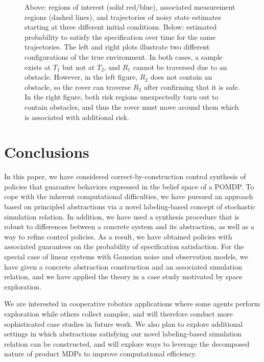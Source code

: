 \documentclass{ifacconf}
\begin{document}
\begin{figure}
  \footnotesize
  \setlength{}
  \setlength{}

  \begin{center}
       
  \end{center}

  \setlength{}
  \setlength{}

  \begin{center}
       
  \end{center}
  \caption{Above: regions of interest (solid red/blue), associated measurement regions (dashed lines), and trajectories of noisy state estimates starting at three different initial conditions. Below: estimated probability to satisfy the specification over time for the same trajectories. The left and right plots illustrate two different configurations of the true environment. In both cases, a sample exists at $T_1$ but not at $T_2$, and $R_1$ cannot be traversed due to an obstacle. However, in the left figure, $R_2$ does not contain an obstacle, so the rover can traverse $R_2$ after confirming that it is safe. In the right figure, both risk regions unexpectedly turn out to contain obstacles, and thus the rover must move around them which is associated with additional risk.}
  \label{fig:exp1}
\end{figure}


\section{Conclusions}
\label{sec:conclusions}

In this paper,  we have considered correct-by-construction control synthesis of policies that guarantee behaviors expressed in the belief space of a POMDP. To cope with the inherent computational difficulties, we have pursued an approach based on principled abstractions via a novel labeling-based concept of stochastic simulation relation. In addition, we have used a synthesis procedure that is robust to differences between a concrete system and its abstraction, as well as a way to refine control policies. As a result, we have obtained policies with associated guarantees on the probability of specification satisfaction. For the special case of linear systems with Gaussian noise and observation models, we have given a concrete abstraction construction and an associated simulation relation, and we have applied the theory in a case study motivated by space exploration.

We are interested in cooperative robotics applications where some agents perform exploration while others collect samples, and will therefore conduct more sophisticated case studies in future work. We also plan to explore additional settings in which abstractions satisfying our novel labeling-based simulation relation can be constructed, and will explore ways to leverage the decomposed nature of product MDPs to improve computational efficiency.


\end{document}
